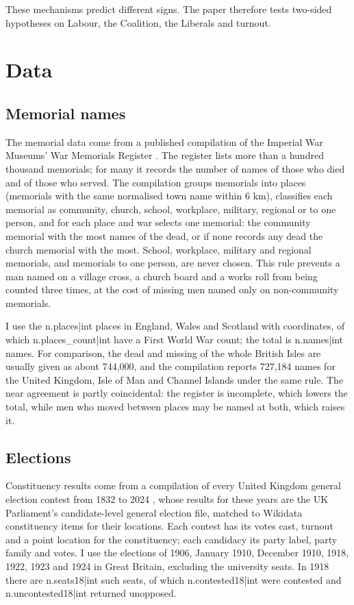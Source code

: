 \documentclass[11pt,a4paper]{article}
\begin{document}
These mechanisms predict different signs. The paper therefore tests two-sided hypotheses on Labour, the Coalition, the Liberals and turnout.

\section{Data}\label{sec:data}
\subsection{Memorial names}
The memorial data come from a published compilation of the Imperial War Museums' War Memorials Register \citep{iwm,hotham2026wm}. The register lists more than a hundred thousand memorials; for many it records the number of names of those who died and of those who served. The compilation groups memorials into places (memorials with the same normalised town name within 6 km), classifies each memorial as community, church, school, workplace, military, regional or to one person, and for each place and war selects one memorial: the community memorial with the most names of the dead, or if none records any dead the church memorial with the most. School, workplace, military and regional memorials, and memorials to one person, are never chosen. This rule prevents a man named on a village cross, a church board and a works roll from being counted three times, at the cost of missing men named only on non-community memorials.

I use the {{n.places|int}} places in England, Wales and Scotland with coordinates, of which {{n.places_count|int}} have a First World War count; the total is {{n.names|int}} names. For comparison, the dead and missing of the whole British Isles are usually given as about 744,000, and the compilation reports 727,184 names for the United Kingdom, Isle of Man and Channel Islands under the same rule. The near agreement is partly coincidental: the register is incomplete, which lowers the total, while men who moved between places may be named at both, which raises it.

\subsection{Elections}
Constituency results come from a compilation of every United Kingdom general election contest from 1832 to 2024 \citep{hotham2026el}, whose results for these years are the UK Parliament's candidate-level general election file, matched to Wikidata constituency items for their locations. Each contest has its votes cast, turnout and a point location for the constituency; each candidacy its party label, party family and votes. I use the elections of 1906, January 1910, December 1910, 1918, 1922, 1923 and 1924 in Great Britain, excluding the university seats. In 1918 there are {{n.seats18|int}} such seats, of which {{n.contested18|int}} were contested and {{n.uncontested18|int}} returned unopposed.
\end{document}
